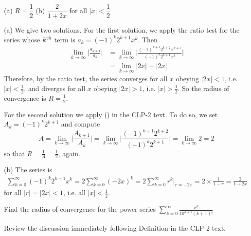 \begin{answer}
(a) $R = \dfrac{1}{2}$\qquad
(b) $\dfrac{2}{1+2x}$ for all $|x|<\dfrac{1}{2}$
\end{answer}

\begin{solution} (a)
We give two solutions. For the first solution, we apply the ratio test for the series whose $k^{\rm th}$
term is $a_k= (-1)^k 2^{k+1} x^k$. Then
\begin{align*}
\lim_{k\to\infty} \bigg| \frac{ a_{k+1} }{ a_k } \bigg|
&= \lim_{k\to\infty} \bigg| \frac{(-1)^{k+1} 2^{k+2} x^{k+1}}
                            {(-1)^k 2^{k+1} x^k} \bigg| \\
&= \lim_{k\to\infty}|2x| = |2x|
\end{align*}
Therefore, by the ratio test, the series converges for all $x$
obeying $|2x|<1$, i.e. $|x|<\frac{1}{2}$, and diverges for all $x$
obeying $|2x|>1$, i.e. $|x|>\frac{1}{2}$.
So the radius of convergence is $R = \frac{1}{2}$.

For the second solution we apply () in the CLP-2 text. To do so, we set $A_k = (-1)^k 2^{k+1}$ and compute
\begin{equation*}
A = \lim_{k\to\infty} \bigg| \frac{A_{k+1}}{A_k}\bigg|
  = \lim_{k\to\infty} \bigg| \frac{(-1)^{k+1} 2^{k+2}}{(-1)^k 2^{k+1}}\bigg|
  = \lim_{k\to\infty} 2
  =2
\end{equation*}
so that $R=\frac{1}{A}=\frac{1}{2}$, again.

\noindent (b) The series is
\begin{align*}
\sum_{k=0}^\infty (-1)^k 2^{k+1} x^k
=2 \sum_{k=0}^\infty (-2x)^k
=2\sum_{k=0}^\infty r^k\Big|_{r=-2x}
=2\times\frac{1}{1-r}
=\frac{2}{1+2x}
\end{align*}
for all $|r|=|2x|<1$, i.e. all $|x|<\frac{1}{2}$.


\end{solution}



\begin{Mquestion}[M105 2014A]
Find the radius of convergence for the power series
$\displaystyle\sum_{k=0}^\infty \frac{x^k}{10^{k+1}(k+1)!}$
\end{Mquestion}

\begin{hint}
Review the discussion immediately following Definition
 in the
CLP-2 text.
\end{hint}


